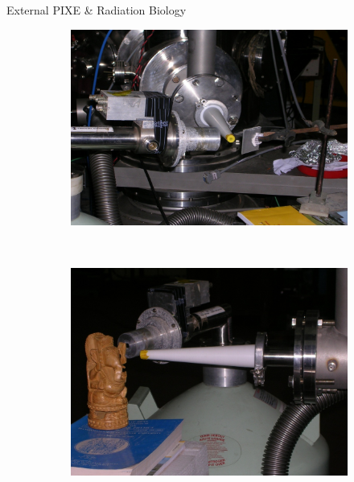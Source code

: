 \documentclass[11pt]{beamer}
\begin{document}
\begin{frame}{External PIXE \& Radiation Biology}

  \begin{figure}
        \centering
        \begin{subfigure}[b]{0.3\textwidth}
                \includegraphics[width=\textwidth]{External_pixe1.jpg}
        \end{subfigure}%
        ~ %
        \begin{subfigure}[b]{0.3\textwidth}
                \includegraphics[width=\textwidth]{External_pixe2.jpg}
        \end{subfigure}
       

\end{figure}
\end{frame}
\end{document}
